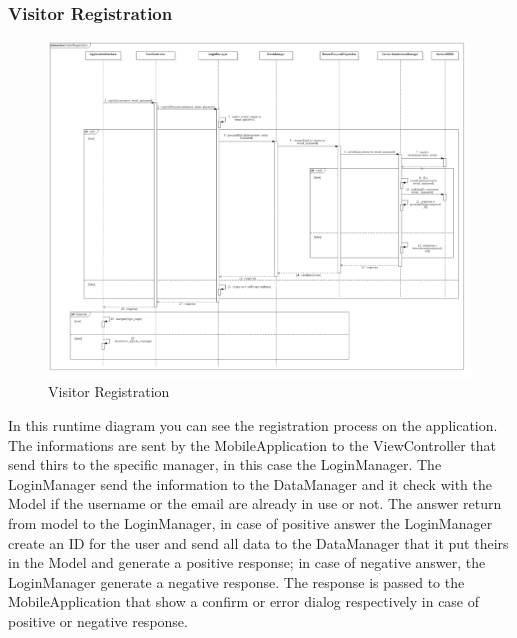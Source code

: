 \subsubsection{Visitor Registration}
\begin{figure}[H]
\centering
\includegraphics[scale=0.25]{images/VisitorRegistration}
\caption{Visitor Registration}
\end{figure}In this runtime diagram you can see the registration process on the application. The informations are sent by the MobileApplication to the ViewController that send thirs to the specific manager, in this case the LoginManager. The LoginManager send the information to the DataManager and it check with the Model if the username or the email are already in use or not. The answer return from model to the LoginManager, in case of positive answer the LoginManager create an ID for the user and send all data to the DataManager that it put theirs in the Model and generate a positive response; in case of negative answer, the LoginManager generate a negative response. The response is passed to the MobileApplication that show a confirm or error dialog respectively in case of positive or negative response.

